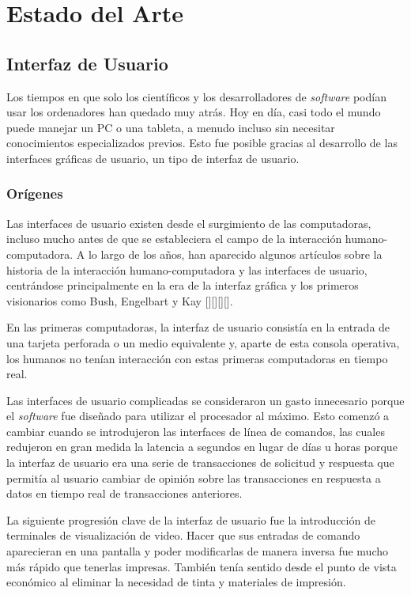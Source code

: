 \chapter{Estado del Arte}\label{chapter:state-of-the-art}

\section{Interfaz de Usuario}

Los tiempos en que solo los científicos y los desarrolladores de \textit{software} podían usar los ordenadores han quedado muy atrás. Hoy en día, casi todo el mundo puede manejar un PC o una tableta, a menudo incluso sin necesitar conocimientos especializados previos. Esto fue posible gracias al desarrollo de las interfaces gráficas de usuario, un tipo de interfaz de usuario.

\subsection{Orígenes}

Las interfaces de usuario existen desde el surgimiento de las computadoras, incluso mucho antes de que se estableciera el campo de la interacción humano-computadora. A lo largo de los años, han aparecido algunos artículos sobre la historia de la interacción humano-computadora y las interfaces de usuario, centrándose principalmente en la era de la interfaz gráfica y los primeros visionarios como Bush, Engelbart y Kay [\cite{5}][\cite{6}][\cite{7}][\cite{8}].

En las primeras computadoras, la interfaz de usuario consistía en la entrada de una tarjeta perforada o un medio equivalente y, aparte de esta consola operativa, los humanos no tenían interacción con estas primeras computadoras en tiempo real.

Las interfaces de usuario complicadas se consideraron un gasto innecesario porque el \textit{software} fue diseñado para utilizar el procesador al máximo. Esto comenzó a cambiar cuando se introdujeron las interfaces de línea de comandos, las cuales redujeron en gran medida la latencia a segundos en lugar de días u horas porque la interfaz de usuario era una serie de transacciones de solicitud y respuesta que permitía al usuario cambiar de opinión sobre las transacciones en respuesta a datos en tiempo real de transacciones anteriores.

La siguiente progresión clave de la interfaz de usuario fue la introducción de terminales de visualización de video. Hacer que sus entradas de comando aparecieran en una pantalla y poder modificarlas de manera inversa fue mucho más rápido que tenerlas impresas. También tenía sentido desde el punto de vista económico al eliminar la necesidad de tinta y materiales de impresión.

